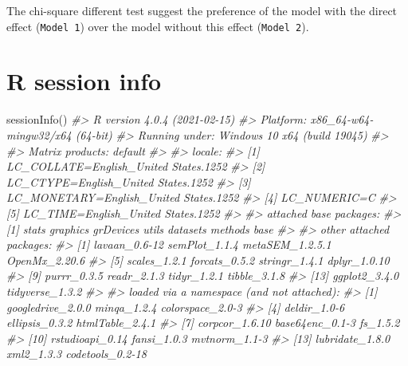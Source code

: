 \documentclass[
]{book}
\newenvironment{Shaded}{\begin{snugshade}}{\end{snugshade}}
\newcommand{\CommentTok}[1]{\textcolor[rgb]{0.56,0.35,0.01}{\textit{#1}}}
\newcommand{\FunctionTok}[1]{\textcolor[rgb]{0.00,0.00,0.00}{#1}}
\newcommand{\NormalTok}[1]{#1}
\begin{document}
The chi-square different test suggest the preference of the model with the direct effect (\texttt{Model\ 1}) over the model without this effect (\texttt{Model\ 2}).

\hypertarget{r-session-info}{%
\chapter{R session info}\label{r-session-info}}

\begin{Shaded}
\begin{Highlighting}[]
\FunctionTok{sessionInfo}\NormalTok{()}
\CommentTok{\#\textgreater{} R version 4.0.4 (2021{-}02{-}15)}
\CommentTok{\#\textgreater{} Platform: x86\_64{-}w64{-}mingw32/x64 (64{-}bit)}
\CommentTok{\#\textgreater{} Running under: Windows 10 x64 (build 19045)}
\CommentTok{\#\textgreater{} }
\CommentTok{\#\textgreater{} Matrix products: default}
\CommentTok{\#\textgreater{} }
\CommentTok{\#\textgreater{} locale:}
\CommentTok{\#\textgreater{} [1] LC\_COLLATE=English\_United States.1252 }
\CommentTok{\#\textgreater{} [2] LC\_CTYPE=English\_United States.1252   }
\CommentTok{\#\textgreater{} [3] LC\_MONETARY=English\_United States.1252}
\CommentTok{\#\textgreater{} [4] LC\_NUMERIC=C                          }
\CommentTok{\#\textgreater{} [5] LC\_TIME=English\_United States.1252    }
\CommentTok{\#\textgreater{} }
\CommentTok{\#\textgreater{} attached base packages:}
\CommentTok{\#\textgreater{} [1] stats     graphics  grDevices utils     datasets  methods   base     }
\CommentTok{\#\textgreater{} }
\CommentTok{\#\textgreater{} other attached packages:}
\CommentTok{\#\textgreater{}  [1] lavaan\_0.6{-}12   semPlot\_1.1.4   metaSEM\_1.2.5.1 OpenMx\_2.20.6  }
\CommentTok{\#\textgreater{}  [5] scales\_1.2.1    forcats\_0.5.2   stringr\_1.4.1   dplyr\_1.0.10   }
\CommentTok{\#\textgreater{}  [9] purrr\_0.3.5     readr\_2.1.3     tidyr\_1.2.1     tibble\_3.1.8   }
\CommentTok{\#\textgreater{} [13] ggplot2\_3.4.0   tidyverse\_1.3.2}
\CommentTok{\#\textgreater{} }
\CommentTok{\#\textgreater{} loaded via a namespace (and not attached):}
\CommentTok{\#\textgreater{}   [1] googledrive\_2.0.0   minqa\_1.2.4         colorspace\_2.0{-}3   }
\CommentTok{\#\textgreater{}   [4] deldir\_1.0{-}6        ellipsis\_0.3.2      htmlTable\_2.4.1    }
\CommentTok{\#\textgreater{}   [7] corpcor\_1.6.10      base64enc\_0.1{-}3     fs\_1.5.2           }
\CommentTok{\#\textgreater{}  [10] rstudioapi\_0.14     fansi\_1.0.3         mvtnorm\_1.1{-}3      }
\CommentTok{\#\textgreater{}  [13] lubridate\_1.8.0     xml2\_1.3.3          codetools\_0.2{-}18   }

\end{Highlighting}
\end{Shaded}
\end{document}
